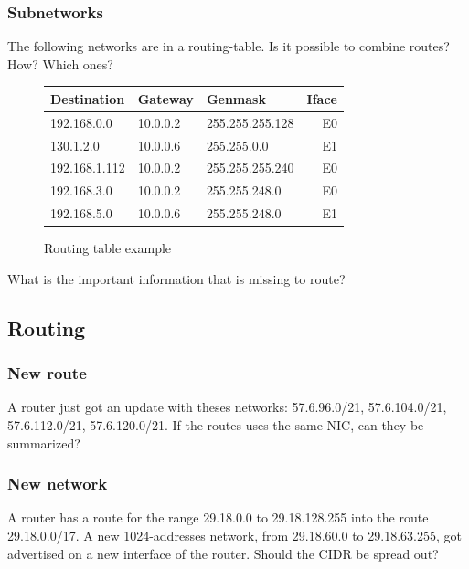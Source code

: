 \documentclass[11pt]{article}
\begin{document}
\subsubsection{Subnetworks}
The following networks are in a routing-table. Is it possible to combine routes? How? Which ones?
\begin{figure}[h]
  \centering
  \resizebox{10cm}{!} {
    \begin{tabular}{lllr}
      \textbf{Destination} & \textbf{Gateway} & \textbf{Genmask} & \textbf{Iface} \\ \hline
      192.168.0.0   & 10.0.0.2 & 255.255.255.128 & E0 \\
      130.1.2.0     & 10.0.0.6 & 255.255.0.0     & E1 \\
      192.168.1.112 & 10.0.0.2 & 255.255.255.240 & E0 \\
      192.168.3.0   & 10.0.0.2 & 255.255.248.0   & E0 \\
      192.168.5.0   & 10.0.0.6 & 255.255.248.0   & E1 \\
    \end{tabular}
  }
  \caption{Routing table example}
  \label{fig:rting-tbl}
\end{figure}
What is the important information that is missing to route? %
\subsection{Routing}
\subsubsection{New route}
A router just got an update with theses networks: 57.6.96.0/21, 57.6.104.0/21, 57.6.112.0/21, 57.6.120.0/21. If the routes uses the same NIC, can they be summarized? %
\subsubsection{New network}
A router has a route for the range 29.18.0.0 to 29.18.128.255 into the route 29.18.0.0/17. A new 1024-addresses network, from 29.18.60.0 to 29.18.63.255, got advertised on a new interface of the router. Should the CIDR be spread out? %
\end{document}
